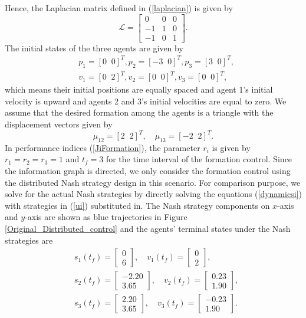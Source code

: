 \documentclass[12pt,draftcls,onecolumn]{IEEEtran}  %
\begin{document}
Hence, the Laplacian matrix defined in (\ref{laplacian}) is given by
\[\mathcal{L}=\begin{bmatrix}
0&0&0\\
-1&1&0\\
-1&0&1
\end{bmatrix}.\]
The initial states of the three agents are given by
{\begin{align*}
&p_1=[0\;\;0]^T, p_2=[-3\;\;0]^T,p_3=[3\;\;0]^T,\\
&v_1=[0\;\;2]^T,v_2=[0\;\;0]^T,v_3=[0\;\;0]^T,
\end{align*}}
which means their initial positions are equally spaced and agent 1's initial velocity is upward and agents 2 and 3's initial velocities are equal to zero. We assume that the desired formation among the agents is a triangle with the displacement vectors given by
\[\mu_{12}=[2\;\; 2]^T,\quad \mu_{13}=[-2\;\; 2]^T.\]
In performance indices (\ref{JiFormation}), the parameter $r_i$ is given by $r_1=r_2=r_3=1$ and $t_f=3$ for the time interval of the formation control. Since the information graph is directed, we only consider the formation control using the distributed Nash strategy design in this scenario. For comparison purpose, we solve for the actual Nash strategies by directly solving the equations (\ref{dynamicsi}) with strategies in (\ref{ui}) substituted in. The Nash strategy components on $x$-axis and $y$-axis are shown as blue trajectories in Figure \ref{Original_Distributed_control} and the agents' terminal states under the Nash strategies are
\begin{align*}
&s_1(t_f)=\begin{bmatrix}
0\\
6
\end{bmatrix},\quad
v_1(t_f)=\begin{bmatrix}
0\\
2
\end{bmatrix},\\
&s_2(t_f)=\begin{bmatrix}
-2.20\\
    3.65
    \end{bmatrix},\quad
    v_2(t_f)=\begin{bmatrix}
0.23\\
    1.90
\end{bmatrix},\\
&s_3(t_f)=\begin{bmatrix}
 2.20\\
    3.65
    \end{bmatrix},\quad
    v_3(t_f)=\begin{bmatrix}
-0.23\\
    1.90
\end{bmatrix}.\end{align*}
\end{document}
